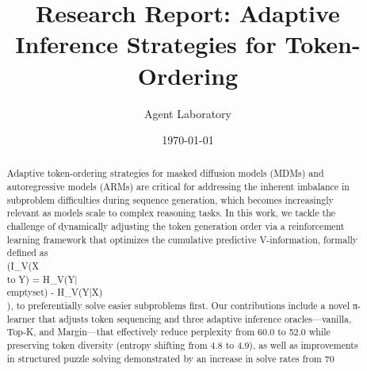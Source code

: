 \documentclass{article}
\title{Research Report: Adaptive Inference Strategies for Token-Ordering}
\author{Agent Laboratory}
\date{\today}
\begin{document}
\maketitle

\begin{abstract}
Adaptive token-ordering strategies for masked diffusion models (MDMs) and autoregressive models (ARMs) are critical for addressing the inherent imbalance in subproblem difficulties during sequence generation, which becomes increasingly relevant as models scale to complex reasoning tasks. In this work, we tackle the challenge of dynamically adjusting the token generation order via a reinforcement learning framework that optimizes the cumulative predictive V-information, formally defined as \\(I_V(X \\to Y) = H_V(Y|\\emptyset) - H_V(Y|X)\\), to preferentially solve easier subproblems first. Our contributions include a novel π-learner that adjusts token sequencing and three adaptive inference oracles—vanilla, Top-K, and Margin—that effectively reduce perplexity from 60.0 to 52.0 while preserving token diversity (entropy shifting from 4.8 to 4.9), as well as improvements in structured puzzle solving demonstrated by an increase in solve rates from 70\\%
\end{abstract}
\end{document}
